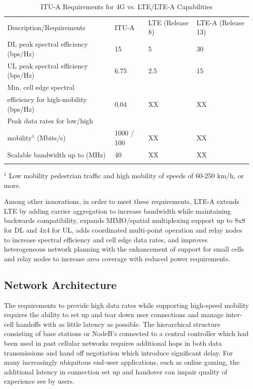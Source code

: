 \begin{table}
	\caption{ITU-A Requirements for 4G vs. LTE/LTE-A Capabilities \cite{tr36913}\cite{lte-3gpp}\cite{itu-advanced}}
	\label{perf-table}      
	\begin{tabular}{p{4.8cm}p{2.4cm}p{2.4cm}p{2.4cm}}
		\hline\noalign{\smallskip}
		Description/Requirements & ITU-A & LTE (Release 8) & LTE-A (Release 13)  \\
		\noalign{\smallskip}\svhline\noalign{\smallskip}
		DL peak spectral efficiency (bps/Hz) &  15   & 5  & 30 \\
		UL peak spectral efficiency (bps/Hz)& 6.75  & 2.5  & 15 \\
		Min. cell edge spectral \\ \hspace{0.8em} efficiency for high-mobility (bps/Hz) & 0.04 & XX & XX \\
		Peak data rates for low/high \\ \hspace{0.8em}mobility$^1$ (Mbits/s) & 1000 / 100   & XX & XX \\
		Scalable bandwidth up to (MHz) & 40 & XX  & XX \\
		
		\noalign{\smallskip}\hline\noalign{\smallskip}
	\end{tabular}
	$^1$ Low mobility pedestrian traffic and high mobility of speeds of 60-250 km/h, or more. 	 
\end{table}
Among other innovations, in order to meet these requirements, LTE-A extends LTE by adding carrier aggregation to increase bandwidth while maintaining backwards compatibility, expands MIMO/spatial multiplexing support up to 8x8 for DL and 4x4 for UL, adds coordinated multi-point operation and relay nodes to increase spectral efficiency and cell edge data rates, and improves heterogeneous network planning with the enhancement of support for small cells and relay nodes to increase area coverage with reduced power requirements.

\subsection{Network Architecture}
\label{net-arch}
The requirements to provide high data rates while supporting high-speed mobility requires the ability to set up and tear down user connections and manage inter-cell handoffs with as little latency as possible.  The hierarchical structure consisting of base stations or NodeB's connected to a central controller which had been used in past cellular networks requires additional hops in both data transmissions and hand off negotiation which introduce significant delay.  For many increasingly ubiquitous end-user applications, such as online gaming, the additional latency in connection set up and handover can impair quality of experience see by users.  

